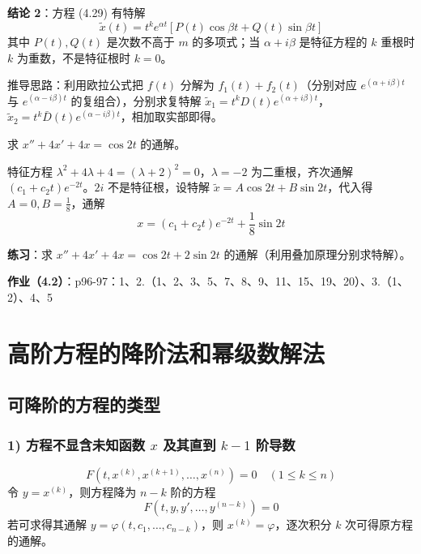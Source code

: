 \textbf{结论 2}：方程 (4.29) 有特解
$$\tilde{x}(t) = t^k e^{\alpha t}[P(t)\cos\beta t + Q(t)\sin\beta t]$$
其中 $P(t), Q(t)$ 是次数不高于 $m$ 的多项式；当 $\alpha + i\beta$ 是特征方程的 $k$ 重根时 $k$ 为重数，不是特征根时 $k = 0$。

\begin{remark}
推导思路：利用欧拉公式把 $f(t)$ 分解为 $f_1(t) + f_2(t)$（分别对应 $e^{(\alpha+i\beta)t}$ 与 $e^{(\alpha-i\beta)t}$ 的复组合），分别求复特解 $\tilde{x}_1 = t^kD(t)e^{(\alpha+i\beta)t}$，$\tilde{x}_2 = t^k\bar{D}(t)e^{(\alpha-i\beta)t}$，相加取实部即得。
\end{remark}

\begin{example}
求 $x'' + 4x' + 4x = \cos 2t$ 的通解。
\end{example}

\begin{solution}
特征方程 $\lambda^2 + 4\lambda + 4 = (\lambda+2)^2 = 0$，$\lambda = -2$ 为二重根，齐次通解 $(c_1 + c_2t)e^{-2t}$。$2i$ 不是特征根，设特解 $\tilde{x} = A\cos 2t + B\sin 2t$，代入得 $A = 0, B = \frac{1}{8}$，通解
$$x = (c_1 + c_2t)e^{-2t} + \frac{1}{8}\sin 2t$$
\end{solution}

\textbf{练习}：求 $x'' + 4x' + 4x = \cos 2t + 2\sin 2t$ 的通解（利用叠加原理分别求特解）。

\textbf{作业（4.2）}：p96-97：1、2.（1、2、3、5、7、8、9、11、15、19、20）、3.（1、2）、4、5

\section{高阶方程的降阶法和幂级数解法}

\subsection{可降阶的方程的类型}

\subsubsection{1) 方程不显含未知函数 $x$ 及其直到 $k-1$ 阶导数}

$$F(t, x^{(k)}, x^{(k+1)}, \ldots, x^{(n)}) = 0 \quad (1 \le k \le n)$$令 $y = x^{(k)}$，则方程降为 $n - k$ 阶的方程
\begin{equation}F(t, y, y', \ldots, y^{(n-k)}) = 0 \tag{4.51}\end{equation}
若可求得其通解 $y = \varphi(t, c_1, \ldots, c_{n-k})$，则 $x^{(k)} = \varphi$，逐次积分 $k$ 次可得原方程的通解。


